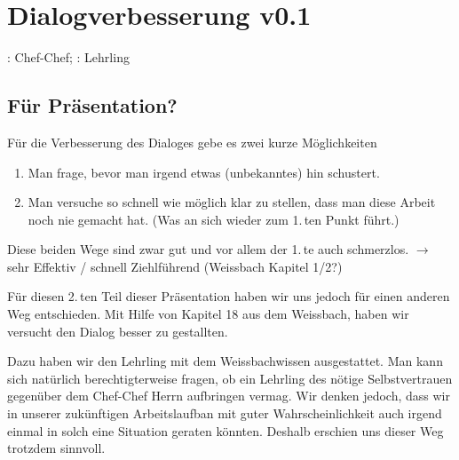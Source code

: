 \section{Dialogverbesserung v0.1}
\herrcc: Chef-Chef; \herrl: Lehrling\\

\subsection{Für Präsentation?}
Für die Verbesserung des Dialoges gebe es zwei kurze Möglichkeiten
\begin{enumerate}
  \item Man frage, bevor man irgend etwas (unbekanntes) hin schustert.
  \item Man versuche so schnell wie möglich klar zu stellen,
          dass man diese Arbeit noch nie gemacht hat. (Was an sich wieder
          zum 1.\,ten Punkt führt.)
\end{enumerate}

Diese beiden Wege sind zwar gut und vor allem der 1.\,te auch schmerzlos.
$\rightarrow$ sehr Effektiv / schnell Ziehlführend (Weissbach Kapitel 1/2?)

Für diesen 2.\,ten Teil dieser Präsentation haben wir uns jedoch für einen anderen
Weg entschieden.  Mit Hilfe von Kapitel 18 aus dem Weissbach, haben wir versucht
den Dialog besser zu gestallten.

Dazu haben wir den Lehrling \herrl mit dem Weissbachwissen ausgestattet.  Man kann
sich natürlich berechtigterweise fragen, ob ein Lehrling des nötige \glqq Selbstvertrauen\grqq 
gegenüber dem Chef-Chef Herrn \herrcc aufbringen vermag.  Wir denken jedoch, dass wir
in unserer zukünftigen Arbeitslaufban mit guter Wahrscheinlichkeit auch irgend einmal
in solch eine Situation geraten könnten. Deshalb erschien uns dieser Weg trotzdem sinnvoll.


